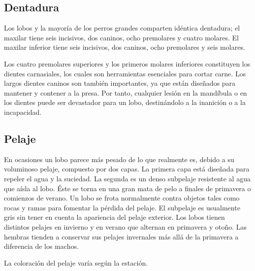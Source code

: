 \documentclass[10pt,letterpaper]{article}
\begin{document}
\subsection{Dentadura}
Los lobos y la mayoría de los perros grandes \hspace{1cm} comparten idéntica dentadura; el maxilar tiene seis incisivos, dos caninos, ocho premolares y cuatro molares. El maxilar inferior tiene seis incisivos, dos caninos, ocho premolares y seis  molares.
 
Los cuatro premolares superiores y los primeros molares inferiores constituyen los dientes carnasiales, los cuales son herramientas esenciales para cortar carne. Los largos dientes caninos son también importantes, ya que están diseñados para mantener y contener a la presa. Por tanto, cualquier lesión en la mandíbula o en los dientes puede ser devastador para un lobo, destinándolo a la inanición o a la \hfill incapacidad.
 
\subsection{Pelaje}

En ocasiones un lobo parece más pesado de lo que realmente es, debido a su voluminoso pelaje, compuesto por dos capas. La primera capa está diseñada para repeler el agua y la suciedad. La segunda es un denso subpelaje resistente al agua que aísla al lobo. Éste se torna en una gran mata de pelo a finales de primavera o comienzos de verano. Un lobo se frota normalmente contra objetos tales como rocas y ramas para fomentar la pérdida del pelaje. El subpelaje es usualmente gris sin tener en cuenta la apariencia del pelaje exterior. Los lobos tienen distintos pelajes en invierno y en verano que alternan en primavera y otoño. Las hembras tienden a conservar sus pelajes invernales más allá de la primavera a diferencia de los \dotfill machos.
 
La coloración del pelaje  varía
\vfill
según la estación.
\end{document}
